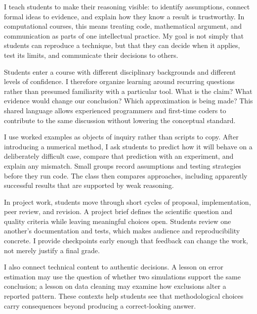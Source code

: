 \documentclass[type=teaching]{careerdossier-statement}
\begin{document}
\MakeCDossierStatementHeader


I teach students to make their reasoning visible: to identify assumptions,
connect formal ideas to evidence, and explain how they know a result is
trustworthy. In computational courses, this means treating code, mathematical
argument, and communication as parts of one intellectual practice. My goal is
not simply that students can reproduce a technique, but that they can decide
when it applies, test its limits, and communicate their decisions to others.

Students enter a course with different disciplinary backgrounds and different
levels of confidence. I therefore organize learning around recurring questions
rather than presumed familiarity with a particular tool. What is the claim?
What evidence would change our conclusion? Which approximation is being made?
This shared language allows experienced programmers and first-time coders to
contribute to the same discussion without lowering the conceptual standard.


I use worked examples as objects of inquiry rather than scripts to copy. After
introducing a numerical method, I ask students to predict how it will behave on
a deliberately difficult case, compare that prediction with an experiment, and
explain any mismatch. Small groups record assumptions and testing strategies
before they run code. The class then compares approaches, including apparently
successful results that are supported by weak reasoning.

In project work, students move through short cycles of proposal, implementation,
peer review, and revision. A project brief defines the scientific question and
quality criteria while leaving meaningful choices open. Students review one
another's documentation and tests, which makes audience and reproducibility
concrete. I provide checkpoints early enough that feedback can change the work,
not merely justify a final grade.

I also connect technical content to authentic decisions. A lesson on error
estimation may use the question of whether two simulations support the same
conclusion; a lesson on data cleaning may examine how exclusions alter a
reported pattern. These contexts help students see that methodological choices
carry consequences beyond producing a correct-looking answer.
\end{document}
